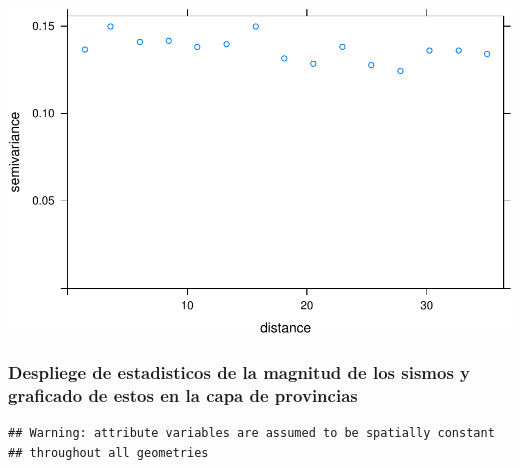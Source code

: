 \documentclass[11pt,]{article}
\newenvironment{Shaded}{\begin{snugshade}}{\end{snugshade}}
\newcommand{\KeywordTok}[1]{\textcolor[rgb]{0.13,0.29,0.53}{\textbf{#1}}}
\newcommand{\DataTypeTok}[1]{\textcolor[rgb]{0.13,0.29,0.53}{#1}}
\newcommand{\StringTok}[1]{\textcolor[rgb]{0.31,0.60,0.02}{#1}}
\newcommand{\OperatorTok}[1]{\textcolor[rgb]{0.81,0.36,0.00}{\textbf{#1}}}
\newcommand{\NormalTok}[1]{#1}
\begin{document}
\includegraphics{proyecto_files/figure-latex/unnamed-chunk-8-1.pdf}

\subsubsection{Despliege de estadisticos de la magnitud de los sismos y
graficado de estos en la capa de
provincias}\label{despliege-de-estadisticos-de-la-magnitud-de-los-sismos-y-graficado-de-estos-en-la-capa-de-provincias}

\begin{Shaded}
\end{Shaded}

\begin{verbatim}
## Warning: attribute variables are assumed to be spatially constant
## throughout all geometries
\end{verbatim}
\end{document}
